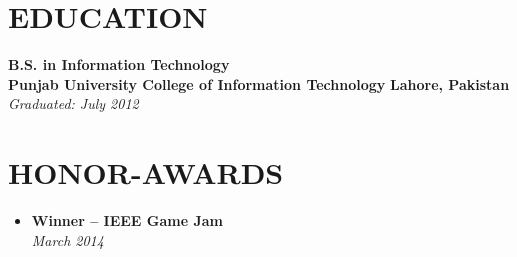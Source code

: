\documentclass[11pt]{article}
\begin{document}
\section*{EDUCATION}
\textbf{B.S. in Information Technology}  \\ 
\textbf{Punjab University College of Information Technology} \hfill \textbf{Lahore, Pakistan}\\
\textit{Graduated: July 2012} 

\section*{HONOR-AWARDS}
\begin{itemize}
    \item \textbf{Winner -- IEEE Game Jam} \\
    \textit{March 2014}
\end{itemize}
\end{document}

